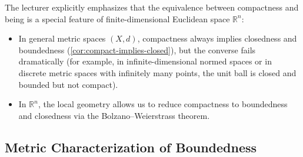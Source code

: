 \begin{content}


\begin{steps}
The lecturer explicitly emphasizes that the equivalence between compactness and being  is a special feature of finite-dimensional Euclidean space $\mathbb{R}^n$:
\begin{itemize}
    \item In general metric spaces $(X, d)$, compactness always implies closedness and boundedness (\cref{cor:compact-implies-closed}), but the converse fails dramatically (for example, in infinite-dimensional normed spaces or in discrete metric spaces with infinitely many points, the unit ball is closed and bounded but not compact).
    \item In $\mathbb{R}^n$, the local geometry allows us to reduce compactness to boundedness and closedness via the Bolzano--Weierstrass theorem.
\end{itemize}
\end{steps}
\end{content}

\subsection{Metric Characterization of Boundedness}

